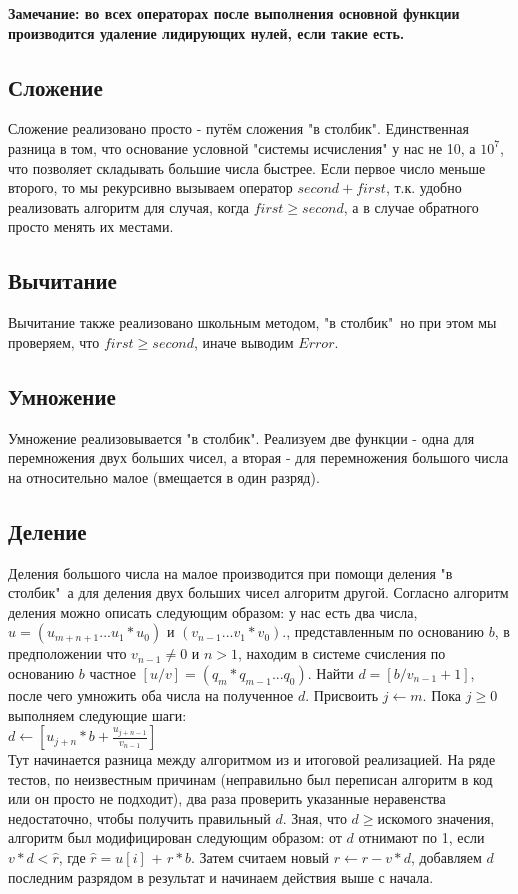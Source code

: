 {\bfseries Замечание: во всех операторах после выполнения основной функции производится удаление лидирующих нулей, если такие есть.}

\subsection{Сложение}
Сложение реализовано просто - путём сложения "в столбик". Единственная разница в том, что основание условной "системы исчисления" у нас не 
10, а $10^7$, что позволяет складывать большие числа быстрее. Если первое число меньше второго, то мы рекурсивно вызываем оператор
$second + first$, т.к. удобно реализовать алгоритм для случая, когда $first \geq second$, а в случае обратного просто менять 
их местами.

\subsection{Вычитание}
Вычитание также реализовано школьным методом, "в столбик"\, но при этом мы проверяем, что $first \geq second$, иначе выводим $Error$.

\subsection{Умножение}
Умножение реализовывается "в столбик". Реализуем две функции - одна для перемножения двух больших чисел, а вторая - для перемножения
большого числа на относительно малое (вмещается в один разряд).

\subsection{Деление}
Деления большого числа на малое производится при помощи деления "в столбик"\, а для деления двух больших чисел алгоритм другой. Согласно
\cite{Knut} алгоритм деления можно описать следующим образом: у нас есть два числа, $u = (u_{m+n+1} ... u_1*u_0)$ 
и $(v_{n-1} ... v_1*v_0)$., представленным по основанию $b$, в предположении что $v_{n-1} \neq 0$ и $n > 1$, находим в системе счисления
по основанию $b$ частное $[u/v] = (q_m*q_{m-1} ... q_0)$. Найти $d = [b/v_{n-1} + 1]$, после чего умножить оба числа на полученное $d$.
Присвоить $j \leftarrow m$. Пока $j \geq 0$ выполняем следующие шаги:
\\ $d \leftarrow [u_{j+n}*b + \frac{u_{j+n-1}}{v_{n-1}}]$
\\ Тут начинается разница между алгоритмом из \cite{Knut} и итоговой реализацией. На ряде тестов, по неизвестным причинам (неправильно был
переписан алгоритм в код или он просто не подходит), два раза проверить указанные неравенства недостаточно, чтобы получить правильный $d$.
Зная, что $d \geq $искомого значения, алгоритм был модифицирован следующим образом: от $d$ отнимают по 1, если $v*d < \hat{r}$, где $\hat{r} = u[i]$ + $r*b$. Затем считаем новый $r \leftarrow r - v*d$, добавляем $d$ последним разрядом в результат и начинаем действия выше с начала.

